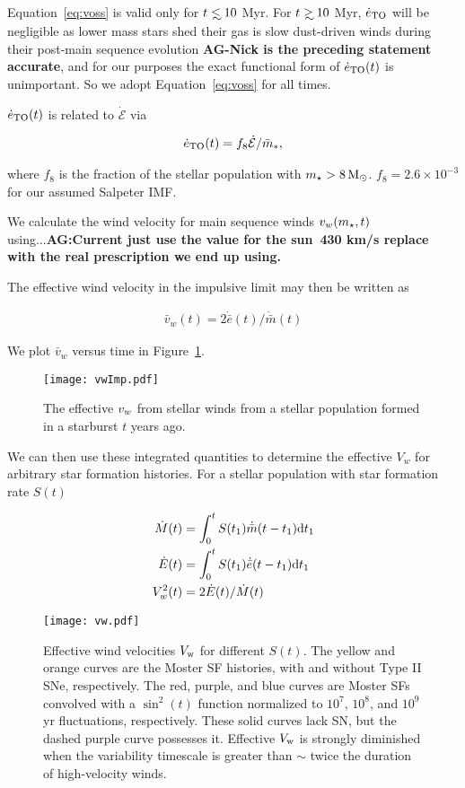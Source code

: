 Equation~\eqref{eq:voss} is valid only for $t \lsim 10$ Myr. For $t\gsim
10$ Myr, $\dot{e}_{\rm TO}$ will be negligible as lower mass stars
shed their gas is slow dust-driven winds during their post-main
sequence evolution {\bf AG-Nick is the preceding statement accurate},
and for our purposes the exact functional form of $\dot{e}_{\rm
  TO}(t)$ is unimportant. So we adopt Equation~\eqref{eq:voss} for all times.

 $\dot{e}_{\rm TO}(t)$ is related to $\dot{\mathcal{E}}$  via 

\begin{align}
\dot{e}_{\rm TO}(t)=f_{8} \dot{\mathcal{E}} / \bar{m}_*,
\label{eq:eto}
\end{align}

where $f_{8}$ is the fraction of the stellar population with $m_{\star}>8
\,{\rm M_\odot}$. $f_8=2.6 \times 10^{-3}$ for our assumed Salpeter IMF.


We calculate the wind velocity for main sequence winds $v_w (m_{\star},
t)$ using...{\bf AG:Current just use the value for the sun~430 km/s
  replace with the real prescription we end up using.}

The effective wind velocity in the impulsive limit may then be written
as 

\begin{align}
\bar{v}_w(t)=2 \dot{\bar{e}}(t)/\dot{\bar{m}}(t)
\label{eq:vwImp}
\end{align}

We plot $\bar{v}_w$ versus time in Figure~\ref{fig:vwImp}.

\begin{figure}
\texttt{[image: vwImp.pdf]}
\caption{\label{fig:vwImp} The effective $v_w$ from stellar winds from
  a stellar population formed in a starburst $t$ years ago.}
\end{figure}

We can then use these integrated quantities to determine the effective
$V_w$ for arbitrary star formation histories. For a stellar population
with star formation rate $S(t)$ 

\begin{align} 
  \dot{M}(t) &= \int_0^t S(t_1) \dot{\bar{m}}(t-t_1){\rm
      d}t_1\\
  \dot{E}(t) &= \int_0^t S(t_1) \dot{\bar{e}}(t-t_1){\rm
      d}t_1\\
  V_w^2(t) &=2 \dot{E}(t)/\dot{M}(t)
\end{align}

\begin{figure}
\texttt{[image: vw.pdf]}
\caption{\label{NickPlot2} Effective wind velocities $V_{\rm w}$ for
different $S(t)$.  The yellow and orange curves are the Moster SF
histories, with and without Type II SNe, respectively.  The red,
purple, and blue curves are Moster SFs convolved with a $\sin^2(t)$
function normalized to $10^7$, $10^8$, and $10^9$ yr fluctuations,
respectively.  These solid curves lack SN, but the dashed purple curve
possesses it.  Effective $V_{\rm w}$ is strongly diminished when the
variability timescale is greater than $\sim$ twice the duration of
high-velocity winds.}
\end{figure}

